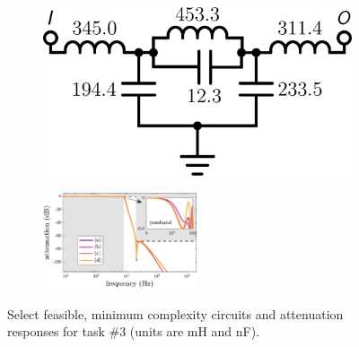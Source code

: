 \begin{figure}
\begin{subfigure}[t]{0.25\textwidth}
\caption{\label{fig:lpf3_circuitc}}
\end{subfigure}%
\begin{subfigure}[t]{0.25\textwidth}
\centering
\includegraphics[scale = 0.14]{../ch6/figures/lpf3_circuit4}
\caption{\label{fig:lpf3_circuitd}}
\end{subfigure}%
\vspace{0.06in}
\begin{subfigure}[t]{\textwidth}
\centering
\includegraphics[width=0.5\textwidth]{../ch6/figures/reduced/r_lpf3_magnitude}
\caption{\label{fig:lpf3_magnitude}}
\end{subfigure}%

\caption[Select feasible, minimum complexity circuits and attenuation responses for  task \#3.]{Select feasible, minimum complexity circuits and attenuation responses for  task \#3 (units are mH and nF).\label{fig:lpf3}}

\end{figure}